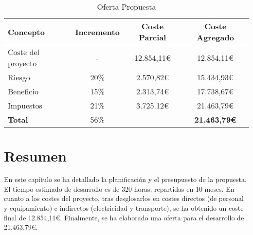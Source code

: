\begin{table}[H]
    \begin{tabular}{@{}lccc@{}}
        \toprule
        \textbf{Concepto} & \textbf{Incremento} & \textbf{Coste Parcial} & \textbf{Coste} \textbf{Agregado}\\
        \midrule
        Coste del proyecto & -    & 12.854,11\euro & 12.854,11\euro\\
        Riesgo             & 20\% &  2.570,82\euro & 15.434,93\euro\\
        Beneficio          & 15\% &  2.313,74\euro & 17.738,67\euro\\
        Impuestos          & 21\% &  3.725.12\euro & 21.463,79\euro\\
        \midrule
        \textbf{Total}     & 56\% &        & \textbf{21.463,79\euro}\\
        \bottomrule
    \end{tabular}
    \caption{Oferta Propuesta}\label{tab:offer}
\end{table}

\section{Resumen}

En este capítulo se ha detallado la planificación y el presupuesto de la propuesta. El tiempo estimado de desarrollo es de 320 horas, repartidas en 10 meses. En cuanto a los costes del proyecto, tras desglosarlos en costes directos (de personal y equipamiento) e indirectos (electricidad y transporte), se ha obtenido un coste final de 12.854,11\euro. Finalmente, se ha elaborado una oferta para el desarrollo de 21.463,79\euro.
